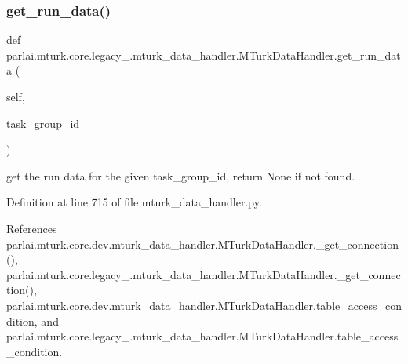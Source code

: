 \subsubsection{\texorpdfstring{get\+\_\+run\+\_\+data()}{get\_run\_data()}}
{\footnotesize\ttfamily def parlai.\+mturk.\+core.\+legacy\+\_.\+mturk\+\_\+data\+\_\+handler.\+M\+Turk\+Data\+Handler.\+get\+\_\+run\+\_\+data (\begin{DoxyParamCaption}\item[{}]{self,  }\item[{}]{task\+\_\+group\+\_\+id }\end{DoxyParamCaption})}

\begin{DoxyVerb}get the run data for the given task_group_id, return None if not
found.
\end{DoxyVerb}
 

Definition at line 715 of file mturk\+\_\+data\+\_\+handler.\+py.



References parlai.\+mturk.\+core.\+dev.\+mturk\+\_\+data\+\_\+handler.\+M\+Turk\+Data\+Handler.\+\_\+get\+\_\+connection(), parlai.\+mturk.\+core.\+legacy\+\_.\+mturk\+\_\+data\+\_\+handler.\+M\+Turk\+Data\+Handler.\+\_\+get\+\_\+connection(), parlai.\+mturk.\+core.\+dev.\+mturk\+\_\+data\+\_\+handler.\+M\+Turk\+Data\+Handler.\+table\+\_\+access\+\_\+condition, and parlai.\+mturk.\+core.\+legacy\+\_.\+mturk\+\_\+data\+\_\+handler.\+M\+Turk\+Data\+Handler.\+table\+\_\+access\+\_\+condition.

